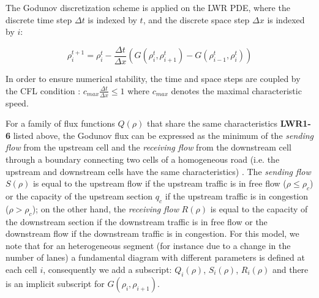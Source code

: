 The Godunov discretization scheme is applied on the LWR PDE, where the discrete time step $\Delta t$ is indexed by $t$, and the discrete space step $\Delta x$ is indexed by $i$:

\begin{equation} \label{eq:rhoGodunov}
\rho^{t+1}_{i} = \rho^{t}_{i} - \frac{\Delta t}{\Delta x}\left(G(\rho^{t}_{i},\rho^{t}_{i+1})-G(\rho^{t}_{i-1},\rho^{t}_{i})\right)
\end{equation}

\noindent In order to ensure numerical stability, the time and space steps are coupled by the CFL condition \cite{LeVeque1992}: $c_{max}\frac{\Delta t}{\Delta x} \leq 1$ where $c_{max}$ denotes the maximal characteristic speed.

For a family of flux functions $Q(\rho)$ that share the same characteristics \textbf{LWR1-6} listed above, the Godunov flux can be expressed as the minimum of the \textit{sending flow} from the upstream cell and the \textit{receiving flow} from the downstream cell through a boundary connecting two cells of a homogeneous road (i.e. the upstream and downstream cells have the same characteristics) \footnotemark. The \textit{sending flow} $S(\rho)$ is equal to the upstream flow if the upstream traffic is in free flow ($\rho \leq \rho_{c}$) or the capacity of the upstream section $q_{c}$ if the upstream traffic is in congestion ($\rho > \rho_{c}$); on the other hand, the \textit{receiving flow} $R(\rho)$ is equal to the capacity of the downstream section if the downstream traffic is in free flow or the downstream flow if the downstream traffic is in congestion. For this model, we note that for an heterogeneous segment (for instance due to a change in the number of lanes) a fundamental diagram with different parameters is defined at each cell $i$, consequently we add a subscript: $Q_{i}(\rho)$, $S_{i}(\rho)$, $R_{i}(\rho)$ and there is an implicit subscript for $G(\rho_{i},\rho_{i+1})$.


